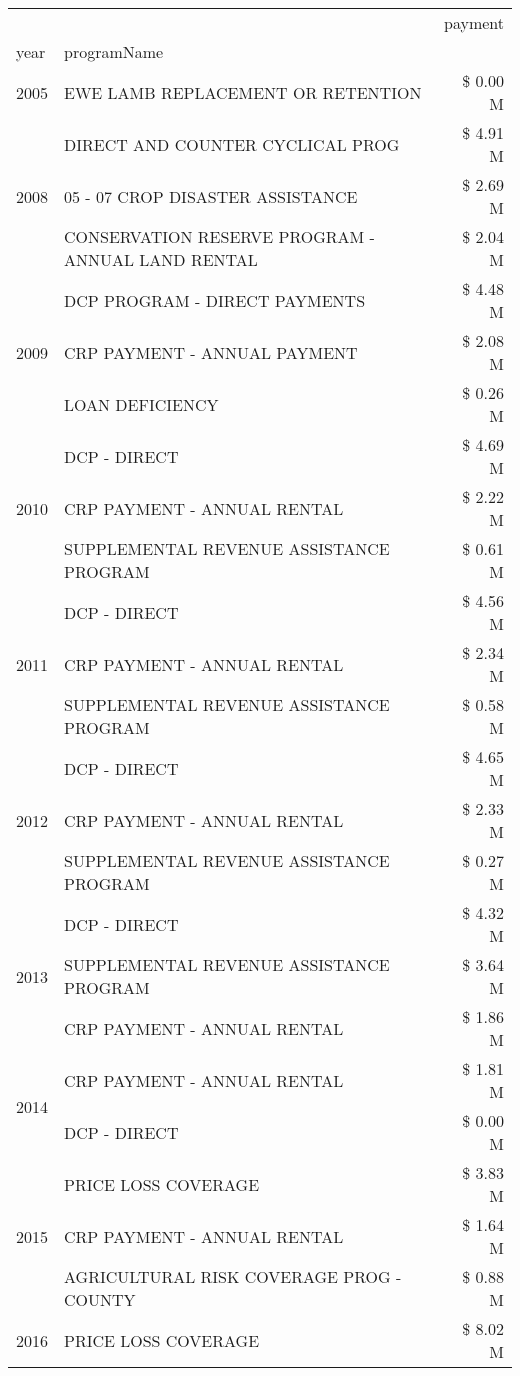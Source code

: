 \begin{tabular}{llr}
\toprule
 &  & payment \\
year & programName &  \\
\midrule
2005 & EWE LAMB REPLACEMENT OR RETENTION & \$ 0.00 M \\
\cline{1-3}
\multirow[t]{3}{*}{2008} & DIRECT AND COUNTER CYCLICAL PROG & \$ 4.91 M \\
 & 05 - 07 CROP DISASTER ASSISTANCE & \$ 2.69 M \\
 & CONSERVATION RESERVE PROGRAM - ANNUAL LAND RENTAL & \$ 2.04 M \\
\cline{1-3}
\multirow[t]{3}{*}{2009} & DCP PROGRAM - DIRECT PAYMENTS & \$ 4.48 M \\
 & CRP PAYMENT - ANNUAL PAYMENT & \$ 2.08 M \\
 & LOAN DEFICIENCY & \$ 0.26 M \\
\cline{1-3}
\multirow[t]{3}{*}{2010} & DCP - DIRECT & \$ 4.69 M \\
 & CRP PAYMENT - ANNUAL RENTAL & \$ 2.22 M \\
 & SUPPLEMENTAL REVENUE ASSISTANCE PROGRAM & \$ 0.61 M \\
\cline{1-3}
\multirow[t]{3}{*}{2011} & DCP - DIRECT & \$ 4.56 M \\
 & CRP PAYMENT - ANNUAL RENTAL & \$ 2.34 M \\
 & SUPPLEMENTAL REVENUE ASSISTANCE PROGRAM & \$ 0.58 M \\
\cline{1-3}
\multirow[t]{3}{*}{2012} & DCP - DIRECT & \$ 4.65 M \\
 & CRP PAYMENT - ANNUAL RENTAL & \$ 2.33 M \\
 & SUPPLEMENTAL REVENUE ASSISTANCE PROGRAM & \$ 0.27 M \\
\cline{1-3}
\multirow[t]{3}{*}{2013} & DCP - DIRECT & \$ 4.32 M \\
 & SUPPLEMENTAL REVENUE ASSISTANCE PROGRAM & \$ 3.64 M \\
 & CRP PAYMENT - ANNUAL RENTAL & \$ 1.86 M \\
\cline{1-3}
\multirow[t]{2}{*}{2014} & CRP PAYMENT - ANNUAL RENTAL & \$ 1.81 M \\
 & DCP - DIRECT & \$ 0.00 M \\
\cline{1-3}
\multirow[t]{3}{*}{2015} & PRICE LOSS COVERAGE & \$ 3.83 M \\
 & CRP PAYMENT - ANNUAL RENTAL & \$ 1.64 M \\
 & AGRICULTURAL RISK COVERAGE PROG - COUNTY & \$ 0.88 M \\
\cline{1-3}
\multirow[t]{3}{*}{2016} & PRICE LOSS COVERAGE & \$ 8.02 M \\

\end{tabular}
